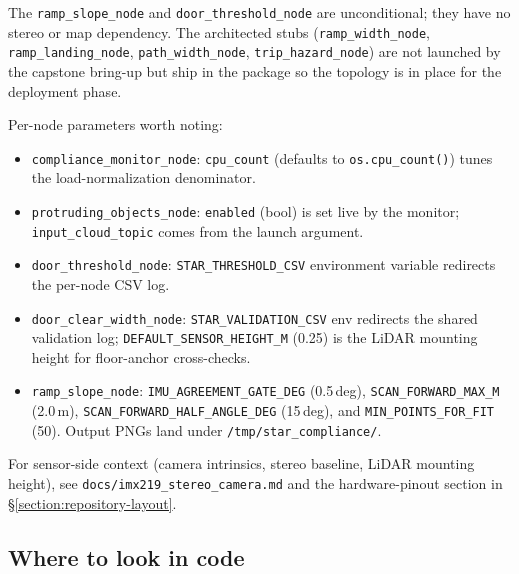 The \texttt{ramp\_slope\_node} and \texttt{door\_threshold\_node} are
unconditional; they have no stereo or map dependency. The architected
stubs (\texttt{ramp\_width\_node}, \texttt{ramp\_landing\_node},
\texttt{path\_width\_node}, \texttt{trip\_hazard\_node}) are not
launched by the capstone bring-up but ship in the package so the
topology is in place for the deployment phase.

Per-node parameters worth noting:

\begin{itemize}
  \item \texttt{compliance\_monitor\_node}: \texttt{cpu\_count} (defaults to \texttt{os.cpu\_count()}) tunes the load-normalization denominator.
  \item \texttt{protruding\_objects\_node}: \texttt{enabled} (bool) is set live by the monitor; \texttt{input\_cloud\_topic} comes from the launch argument.
  \item \texttt{door\_threshold\_node}: \texttt{STAR\_THRESHOLD\_CSV} environment variable redirects the per-node CSV log.
  \item \texttt{door\_clear\_width\_node}: \texttt{STAR\_VALIDATION\_CSV} env redirects the shared validation log; \texttt{DEFAULT\_SENSOR\_HEIGHT\_M} (0.25) is the LiDAR mounting height for floor-anchor cross-checks.
  \item \texttt{ramp\_slope\_node}: \texttt{IMU\_AGREEMENT\_GATE\_DEG} (0.5\,deg), \texttt{SCAN\_FORWARD\_MAX\_M} (2.0\,m), \texttt{SCAN\_FORWARD\_HALF\_ANGLE\_DEG} (15\,deg), and \texttt{MIN\_POINTS\_FOR\_FIT} (50). Output PNGs land under \texttt{/tmp/star\_compliance/}.
\end{itemize}

For sensor-side context (camera intrinsics, stereo baseline, LiDAR
mounting height), see \texttt{docs/imx219\_stereo\_camera.md} and the
hardware-pinout section in \S\ref{section:repository-layout}.

\subsection{Where to look in code}

